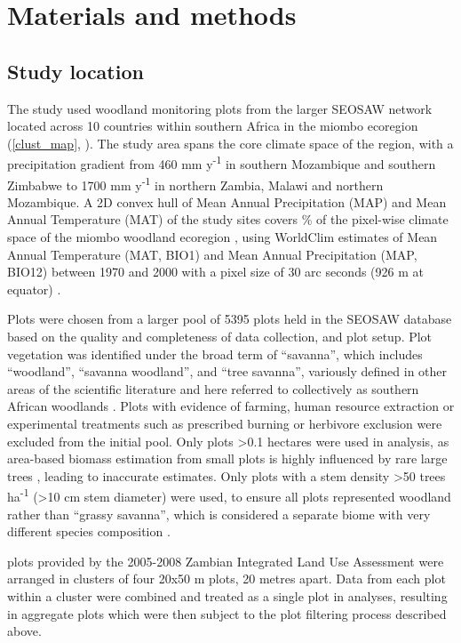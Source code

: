 \documentclass[11pt,a4paper]{article}
\newcommand{\textapprox}{\raisebox{0.5ex}{\texttildelow}}  %
\begin{document}
\section{Materials and methods}

\subsection{Study location}

The study used \nplots{} woodland monitoring plots from the larger SEOSAW network \citep{seosaw_web} located across 10 countries within southern Africa in the miombo ecoregion (\autoref{clust_map}, \citealt{White1987}). The study area spans the core climate space of the region, with a precipitation gradient from \textapprox{}460 mm y\textsuperscript{-1} in southern Mozambique and southern Zimbabwe to \textapprox{}1700 mm y\textsuperscript{-1} in northern Zambia, Malawi and northern Mozambique. A 2D convex hull of Mean Annual Precipitation (MAP) and Mean Annual Temperature (MAT) of the study sites covers \hullcover{}\% of the pixel-wise climate space of the miombo woodland ecoregion \citep{White1987}, using WorldClim estimates of Mean Annual Temperature (MAT, BIO1) and Mean Annual Precipitation (MAP, BIO12) between 1970 and 2000 with a pixel size of 30 arc seconds (926 m at equator) \citep{Fick2017}. 

Plots were chosen from a larger pool of 5395 plots held in the SEOSAW database \citep{seosaw_web} based on the quality and completeness of data collection, and plot setup. Plot vegetation was identified under the broad term of ``savanna'', which includes ``woodland'', ``savanna woodland'', and ``tree savanna'', variously defined in other areas of the scientific literature and here referred to collectively as southern African woodlands \citep{Ratnam2011, Hill2010}. Plots with evidence of farming, human resource extraction or experimental treatments such as prescribed burning or herbivore exclusion were excluded from the initial pool. Only plots >0.1 hectares were used in analysis, as area-based biomass estimation from small plots is highly influenced by rare large trees \citep{Stegen2011}, leading to inaccurate estimates. Only plots with a stem density >50 trees ha\textsuperscript{-1} (>10 cm stem diameter) were used, to ensure all plots represented woodland rather than ``grassy savanna'', which is considered a separate biome with very different species composition \citep{Parr2014}. 

\nzam{} plots provided by the 2005-2008 Zambian Integrated Land Use Assessment \citep{Mukosha2009, Pelletier2018} were arranged in clusters of four 20x50 m plots, 20 metres apart. Data from each plot within a cluster were combined and treated as a single plot in analyses, resulting in \nzamcluster{} aggregate plots which were then subject to the plot filtering process described above.
\end{document}
